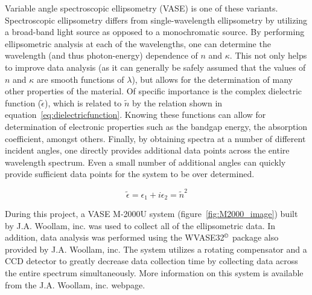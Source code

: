 Variable angle spectroscopic ellipsometry (VASE) is one of these variants. Spectroscopic ellipsometry differs from single-wavelength ellipsometry by utilizing a broad-band light source as opposed to a monochromatic source. By performing ellipsometric analysis at each of the wavelengths, one can determine the wavelength (and thus photon-energy) dependence of $n$ and $\kappa$. This not only helps to improve data analysis (as it can generally be safely assumed that the values of $n$ and $\kappa$ are smooth functions of $\lambda$), but allows for the determination of many other properties of the material. Of specific importance is the complex dielectric function ($\tilde{\epsilon}$), which is related to $\tilde{n}$ by the relation shown in equation~\vref{eq:dielectricfunction}. Knowing these functions can allow for determination of electronic properties such as the bandgap energy, the absorption coefficient, amongst others. Finally, by obtaining spectra at a number of different incident angles, one directly provides additional data points across the entire wavelength spectrum. Even a small number of additional angles can quickly provide sufficient data points for the system to be over determined.\cite{azzam_ellipsometry_1987,schubert_infrared_2005,tompkins_spectroscopic_1999} 

\begin{equation}
 \label{eq:dielectricfunction}
 \displaystyle
	\tilde{\epsilon} = \epsilon_{1} + i\epsilon_{2} = \tilde{n}^{2}
\end{equation}

During this project, a VASE M-2000U system (figure~\vref{fig:M2000_image}) built by J.A. Woollam, inc. was used to collect all of the ellipsometric data. In addition, data analysis was performed using the WVASE32{$^{\copyright}$} package also provided by J.A. Woollam, inc. The system utilizes a rotating compensator and a CCD detector to greatly decrease data collection time by collecting data across the entire spectrum simultaneously.  More information on this system is available from the J.A. Woollam, inc. webpage.\cite{woollam-web}


